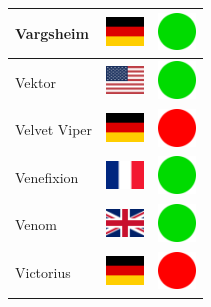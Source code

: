 \documentclass[12pt, a4paper, twoside]{report}
\begin{document}
\begin{center}
\begin{longtable}{|p{5cm}|p{2cm}|p{2cm}|}
Vargsheim & \includegraphics[width=1cm]{4x3/de} & \includegraphics[width=1cm]{likes/y} \\ \hline
Vektor & \includegraphics[width=1cm]{4x3/us} & \includegraphics[width=1cm]{likes/y} \\ \hline
Velvet Viper & \includegraphics[width=1cm]{4x3/de} & \includegraphics[width=1cm]{likes/n} \\ \hline
Venefixion & \includegraphics[width=1cm]{4x3/fr} & \includegraphics[width=1cm]{likes/y} \\ \hline
Venom & \includegraphics[width=1cm]{4x3/gb} & \includegraphics[width=1cm]{likes/y} \\ \hline
Victorius & \includegraphics[width=1cm]{4x3/de} & \includegraphics[width=1cm]{likes/n} \\ \hline

\end{longtable}
\end{center}
\end{document}
